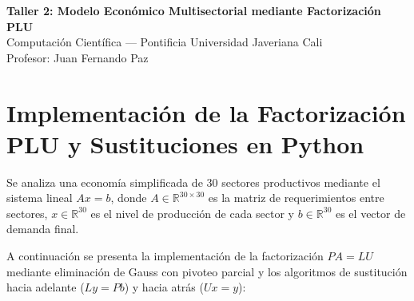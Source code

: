 \documentclass[11pt,a4paper]{article}
\begin{document}
\begin{center}
    {\LARGE\bfseries\color{pujblue} Taller 2: Modelo Económico Multisectorial mediante Factorización PLU}\\[0.3cm]
    {\large Computación Científica --- Pontificia Universidad Javeriana Cali}\\[0.1cm]
    {\normalsize Profesor: Juan Fernando Paz}
\end{center}
\vspace{0.3cm}

\section{Implementación de la Factorización PLU y Sustituciones en Python}

Se analiza una economía simplificada de $30$ sectores productivos mediante el sistema lineal $Ax = b$, donde $A \in \mathbb{R}^{30 \times 30}$ es la matriz de requerimientos entre sectores, $x \in \mathbb{R}^{30}$ es el nivel de producción de cada sector y $b \in \mathbb{R}^{30}$ es el vector de demanda final.

A continuación se presenta la implementación de la factorización $PA = LU$ mediante eliminación de Gauss con pivoteo parcial y los algoritmos de sustitución hacia adelante ($Ly = Pb$) y hacia atrás ($Ux = y$):
\end{document}
